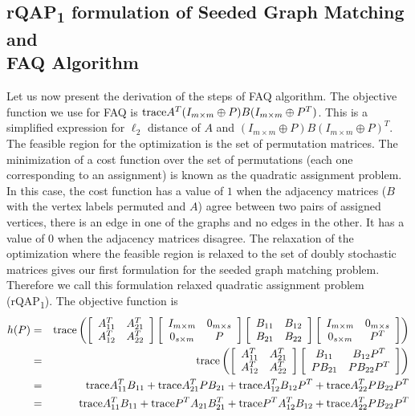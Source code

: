 \documentclass[12pt,oneside,final]{thesis}\usepackage[]{graphicx}\usepackage[]{color}
\begin{document}
\subsection{rQAP\textsubscript{1} formulation of Seeded Graph Matching and \\  FAQ Algorithm}
Let us now present the derivation of the steps of  FAQ algorithm.  The objective function we use for FAQ is $\textup{trace} {A^T(I_{m \times m}\oplus P)B(I_{m \times m}\oplus P^T)}$. This is a simplified expression for $\ell_2$ distance of $A$ and $(I_{m \times m}\oplus P)B(I_{m \times m}\oplus P)^T$. The feasible region for the optimization is the set of permutation matrices. The minimization of  a cost function over the set of permutations (each one corresponding to an assignment) is known as the quadratic assignment problem. In this case, the cost function has a value of $1$ when the adjacency matrices ($B$ with the vertex labels  permuted and  $A$) agree \ie between two pairs of assigned vertices, there is an edge in one of the graphs and no edges in the other. It has a value of $0$ when the adjacency matrices disagree.
The relaxation of the optimization where the feasible region is relaxed to the set of doubly stochastic matrices gives our first formulation for the seeded graph matching problem. Therefore we call this formulation relaxed quadratic assignment problem (rQAP\textsubscript{1}).
The objective function is
\begin{eqnarray*}  h(P)  & =  &   \textup{trace} \left (
\left [  \begin{array}{cc}  A^T_{11} & A^T_{21} \\ A^T_{12} & A^T_{22}  \end{array} \right ]
\left [  \begin{array}{cc}  I_{m \times m} & 0_{m \times s}
\\ 0_{s \times m} & P  \end{array} \right ]
\left [  \begin{array}{cc}  B_{11} & B_{12} \\ B_{21} & B_{22}  \end{array} \right ]
\left [  \begin{array}{cc}  I_{m \times m} & 0_{m \times s}
\\ 0_{s \times m} & P^T  \end{array} \right ]
\right ) \\
& = & \textup{trace} \left (
\left [  \begin{array}{cc}  A^T_{11} & A^T_{21} \\ A^T_{12} & A^T_{22}  \end{array} \right ]
\left [  \begin{array}{cc}  B_{11} & B_{12}P^T \\ PB_{21} & PB_{22}P^T  \end{array} \right ]
\right )\\
& = & \textup{trace} A_{11}^TB_{11}+ \textup{trace} A_{21}^TPB_{21}+\textup{trace} A_{12}^TB_{12}P^T
+ \textup{trace} A_{22}^TPB_{22}P^T \\
& = &  \textup{trace} A_{11}^TB_{11}+ \textup{trace} P^T A_{21}B_{21}^T+\textup{trace} P^TA_{12}^TB_{12}
+ \textup{trace} A_{22}^TPB_{22}P^T
\end{eqnarray*}
\end{document}
